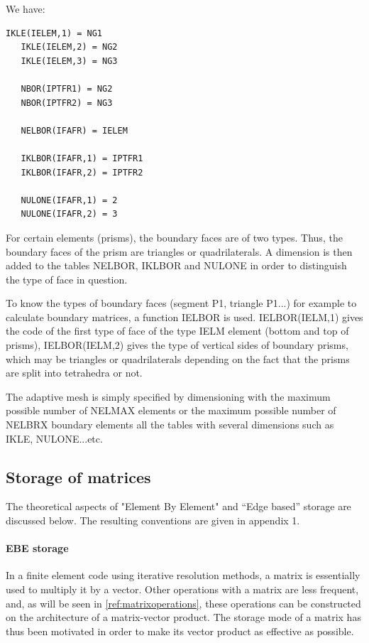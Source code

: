 We have:
\begin{lstlisting}[language=TelFortran]
   IKLE(IELEM,1) = NG1
   IKLE(IELEM,2) = NG2
   IKLE(IELEM,3) = NG3

   NBOR(IPTFR1) = NG2
   NBOR(IPTFR2) = NG3

   NELBOR(IFAFR) = IELEM

   IKLBOR(IFAFR,1) = IPTFR1
   IKLBOR(IFAFR,2) = IPTFR2

   NULONE(IFAFR,1) = 2
   NULONE(IFAFR,2) = 3
\end{lstlisting}

For certain elements (prisms), the boundary faces are of two types. Thus, the
boundary faces of the prism are triangles or quadrilaterals. A dimension is
then added to the tables NELBOR, IKLBOR and NULONE in order to distinguish the
type of face in question.

To know the types of boundary faces (segment P1, triangle P1...) for example to
calculate boundary matrices, a function IELBOR is used. IELBOR(IELM,1) gives
the code of the first type of face of the type IELM element (bottom and top of
prisms), IELBOR(IELM,2) gives the type of vertical sides of boundary prisms,
which may be triangles or quadrilaterals depending on the fact that the prisms
are split into tetrahedra or not.

The adaptive mesh is simply specified by dimensioning with the maximum possible
number of NELMAX elements or the maximum possible number of NELBRX boundary
elements all the tables with several dimensions such as IKLE, NULONE...etc.

\subsection{Storage of matrices}

The theoretical aspects of "Element By Element" and ``Edge based'' storage are
discussed below. The resulting conventions are given in appendix 1.

\paragraph{EBE storage}

In a finite element code using iterative resolution methods, a matrix is
essentially used to multiply it by a vector. Other operations with a matrix are
less frequent, and, as will be seen in \ref{ref:matrixoperations}, these
operations can be
constructed on the architecture of a matrix-vector product. The storage mode of
a matrix has thus been motivated in order to make its vector product as
effective as possible.

